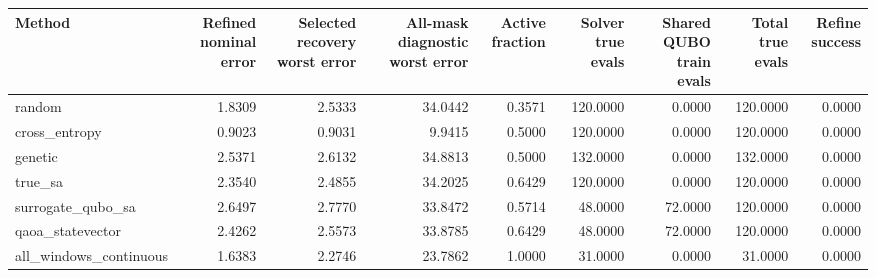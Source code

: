 \begin{tabular}{lrrrrrrrr}
\toprule
Method & Refined nominal error & Selected recovery worst error & All-mask diagnostic worst error & Active fraction & Solver true evals & Shared QUBO train evals & Total true evals & Refine success \\
\midrule
random & 1.8309 & 2.5333 & 34.0442 & 0.3571 & 120.0000 & 0.0000 & 120.0000 & 0.0000 \\
cross\_entropy & 0.9023 & 0.9031 & 9.9415 & 0.5000 & 120.0000 & 0.0000 & 120.0000 & 0.0000 \\
genetic & 2.5371 & 2.6132 & 34.8813 & 0.5000 & 132.0000 & 0.0000 & 132.0000 & 0.0000 \\
true\_sa & 2.3540 & 2.4855 & 34.2025 & 0.6429 & 120.0000 & 0.0000 & 120.0000 & 0.0000 \\
surrogate\_qubo\_sa & 2.6497 & 2.7770 & 33.8472 & 0.5714 & 48.0000 & 72.0000 & 120.0000 & 0.0000 \\
qaoa\_statevector & 2.4262 & 2.5573 & 33.8785 & 0.6429 & 48.0000 & 72.0000 & 120.0000 & 0.0000 \\
all\_windows\_continuous & 1.6383 & 2.2746 & 23.7862 & 1.0000 & 31.0000 & 0.0000 & 31.0000 & 0.0000 \\
\bottomrule
\end{tabular}
